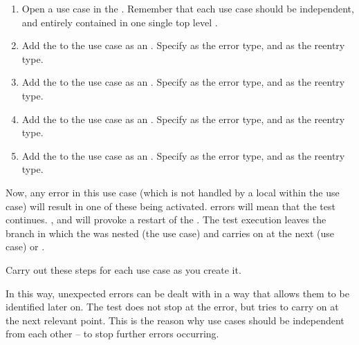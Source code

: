 \begin{enumerate}
\item Open a use case in the \gdtestcaseeditor{}. Remember that each use case should be independent, and entirely contained in one single top level \gdcase{} . 
\item Add the  \gdcase{} to the use case as an \gdehandler{} . Specify  as the error type, and  as the reentry type. 
\item Add the  \gdcase{} to the use case as an \gdehandler{}. Specify  as the error type, and  as the reentry type. 
\item Add the  \gdcase{} to the use case as an \gdehandler{}. Specify  as the error type, and  as the reentry type. 
\item Add the  \gdcase{} to the use case as an \gdehandler{}. Specify  as the error type, and  as the reentry type. 
\end{enumerate}

Now, any error in this use case (which is not handled by a local \gdehandler{} within the use case) will result in one of these \gdehandlers{} being activated.  errors will mean that the test continues.  ,  and  will provoke a restart of the \gdaut{}. The test execution leaves the branch in which the \gdehandler{} was nested (the use case) and carries on at the next \gdcase{} (use case) or \gdsuite{}. 

Carry out these steps for each use case as you create it. 



In this way, unexpected errors can be dealt with in a way that allows them to be identified later on. The test does not stop at the error, but tries to carry on at the next relevant point. This is the reason why use cases should be independent from each other -- to stop further errors occurring. 

